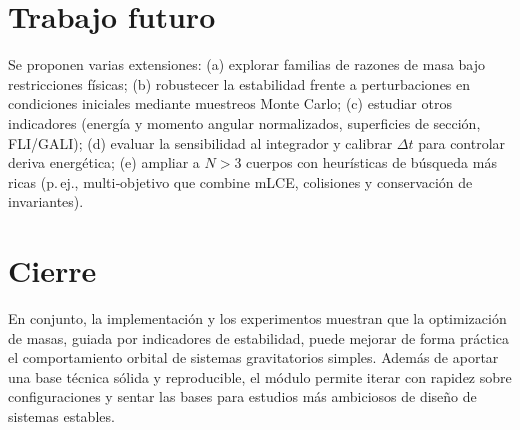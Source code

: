 \section{Trabajo futuro}
Se proponen varias extensiones: (a) explorar familias de razones de masa bajo restricciones físicas; (b) robustecer la estabilidad frente a perturbaciones en condiciones iniciales mediante muestreos Monte Carlo; (c) estudiar otros indicadores (energía y momento angular normalizados, superficies de sección, FLI/GALI); (d) evaluar la sensibilidad al integrador y calibrar \(\Delta t\) para controlar deriva energética; (e) ampliar a \(N>3\) cuerpos con heurísticas de búsqueda más ricas (p.\,ej., multi‑objetivo que combine mLCE, colisiones y conservación de invariantes).

\section{Cierre}
En conjunto, la implementación y los experimentos muestran que la optimización de masas, guiada por indicadores de estabilidad, puede mejorar de forma práctica el comportamiento orbital de sistemas gravitatorios simples. Además de aportar una base técnica sólida y reproducible, el módulo permite iterar con rapidez sobre configuraciones y sentar las bases para estudios más ambiciosos de diseño de sistemas estables.

